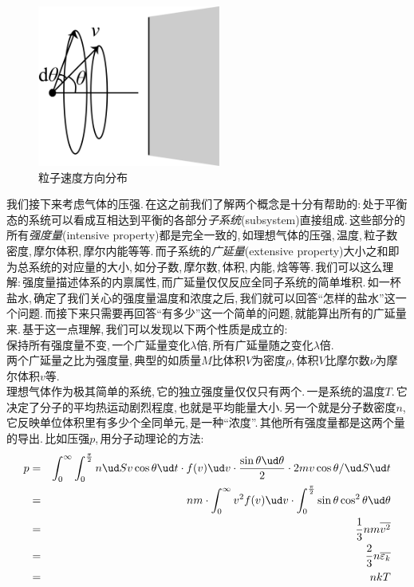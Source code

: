 \begin{figure}
\centering
\includegraphics[width=6cm]{image/5-1-5.png}
\caption{粒子速度方向分布}
\end{figure}
我们接下来考虑气体的压强.\,在这之前我们了解两个概念是十分有帮助的:\,处于平衡态的系统可以看成互相达到平衡的各部分\emph{子系统}(subsystem)直接组成.\,这些部分的所有\emph{强度量}(intensive property)都是完全一致的,\,如理想气体的压强,\,温度,\,粒子数密度,\,摩尔体积,\,摩尔内能等等.\,而子系统的\emph{广延量}(extensive property)大小之和即为总系统的对应量的大小,\,如分子数,\,摩尔数,\,体积,\,内能,\,焓等等.\,我们可以这么理解:\,强度量描述体系的内禀属性,\,而广延量仅仅反应全同子系统的简单堆积.\,如一杯盐水,\,确定了我们关心的强度量\ca 温度和浓度之后,\,我们就可以回答``怎样的盐水''这一个问题.\,而接下来只需要再回答``有多少''这一个简单的问题,\,就能算出所有的广延量来.\,基于这一点理解,\,我们可以发现以下两个性质是成立的:\\[1pt]

{\hei 保持所有强度量不变,\,一个广延量变化$\lambda$倍,\,所有广延量随之变化$\lambda$倍.}\\[1pt]

{\hei 两个广延量之比为强度量,\,典型的如质量$M$比体积$V$为密度$\rho$,\,体积$V$比摩尔数$\nu$为摩尔体积$v$等.}\\[1pt]

理想气体作为极其简单的系统,\,它的独立强度量仅仅只有两个.\,一是系统的温度$T$.\,它决定了分子的平均热运动剧烈程度,\,也就是平均能量大小.\,另一个就是分子数密度$n$,\,它反映单位体积里有多少个全同单元,\,是一种``浓度''.\,其他所有强度量都是这两个量的导出.\,比如压强$p$,\,用分子动理论的方法:
\begin{eqnarray*}
p 	&=&	\int_0^{\infty}\int_0^{\frac{\pi}{2}}n\ud S v\cos\theta\ud t \cdot f(v)\ud v \cdot\frac{\sin\theta\ud\theta}{2}\cdot 2mv\cos\theta/\ud S\ud t 	\\
	&=&	nm\cdot\int_0^{\infty}v^2 f(v)\ud v \cdot \int_0^{\frac{\pi}{2}}\sin\theta\cos^2\theta\ud\theta	\\
	&=& \frac{1}{3}nm\overline{v^2}		\\
	&=& \frac{2}{3}n\overline{\varepsilon_k}	\\
	&=& nkT
\end{eqnarray*}


